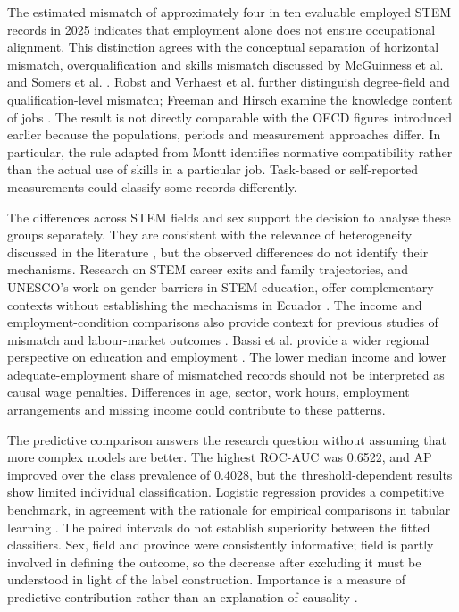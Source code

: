 The estimated mismatch of approximately four in ten evaluable employed STEM records in 2025 indicates that employment alone does not ensure occupational alignment. This distinction agrees with the conceptual separation of horizontal mismatch, overqualification and skills mismatch discussed by McGuinness et al. and Somers et al. \cite{McGuinness2018,Somers2019}. Robst and Verhaest et al. further distinguish degree-field and qualification-level mismatch; Freeman and Hirsch examine the knowledge content of jobs \cite{Robst2008,Verhaest2017,Freeman2008}. The result is not directly comparable with the OECD figures introduced earlier because the populations, periods and measurement approaches differ. In particular, the rule adapted from Montt \cite{Montt2017} identifies normative compatibility rather than the actual use of skills in a particular job. Task-based or self-reported measurements \cite{Reis2018,Salas-Velasco2021} could classify some records differently.

The differences across STEM fields and sex support the decision to analyse these groups separately. They are consistent with the relevance of heterogeneity discussed in the literature \cite{Kiss2024,Deming2020}, but the observed differences do not identify their mechanisms. Research on STEM career exits and family trajectories, and UNESCO's work on gender barriers in STEM education, offer complementary contexts without establishing the mechanisms in Ecuador \cite{Hunt2016,Cech2019,UNESCO2017}. The income and employment-condition comparisons also provide context for previous studies of mismatch and labour-market outcomes \cite{Montt2017,Takeuchi2023,BotelloPealoza2016,DeLaTorreB2025,Nordin2010}. Bassi et al. provide a wider regional perspective on education and employment \cite{Bassi2012}. The lower median income and lower adequate-employment share of mismatched records should not be interpreted as causal wage penalties. Differences in age, sector, work hours, employment arrangements and missing income could contribute to these patterns.

The predictive comparison answers the research question without assuming that more complex models are better. The highest ROC-AUC was 0.6522, and AP improved over the class prevalence of 0.4028, but the threshold-dependent results show limited individual classification. Logistic regression provides a competitive benchmark, in agreement with the rationale for empirical comparisons in tabular learning \cite{James2023,Grinsztajn2022,McElfresh2023}. The paired intervals do not establish superiority between the fitted classifiers. Sex, field and province were consistently informative; field is partly involved in defining the outcome, so the decrease after excluding it must be understood in light of the label construction. Importance is a measure of predictive contribution rather than an explanation of causality \cite{Molnar2025}.

